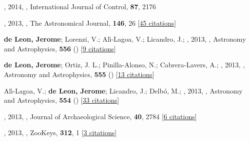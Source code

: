 \item[{\color{numcolor}\scriptsize59}] , 2014, , International Journal of Control, \textbf{87}, 2176

\item[{\color{numcolor}\scriptsize58}] , 2013, , The Astronomical Journal, \textbf{146}, 26 [\href{https://ui.adsabs.harvard.edu/abs/2013AJ....146...26C}{45 citations}]

\item[{\color{numcolor}\scriptsize57}] \textbf{de Leon, Jerome}; Lorenzi, V.; Al{\'\i}-Lagoa, V.; Licandro, J.; \etal, 2013, , Astronomy and Astrophysics, \textbf{556} () [\href{https://ui.adsabs.harvard.edu/abs/2013A&A...556A..33D}{9 citations}]

\item[{\color{numcolor}\scriptsize56}] \textbf{de Leon, Jerome}; Ortiz, J. L.; Pinilla-Alonso, N.; Cabrera-Lavers, A.; \etal, 2013, , Astronomy and Astrophysics, \textbf{555} () [\href{https://ui.adsabs.harvard.edu/abs/2013A&A...555L...2D}{13 citations}]

\item[{\color{numcolor}\scriptsize55}] Al{\'\i}-Lagoa, V.; \textbf{de Leon, Jerome}; Licandro, J.; Delb{\'o}, M.; \etal, 2013, , Astronomy and Astrophysics, \textbf{554} () [\href{https://ui.adsabs.harvard.edu/abs/2013A&A...554A..71A}{33 citations}]

\item[{\color{numcolor}\scriptsize54}] , 2013, , Journal of Archaeological Science, \textbf{40}, 2784 [\href{https://ui.adsabs.harvard.edu/abs/2013JArSc..40.2784H}{6 citations}]

\item[{\color{numcolor}\scriptsize53}] , 2013, , ZooKeys, \textbf{312}, 1 [\href{https://ui.adsabs.harvard.edu/abs/2013ZooK..312....1D}{3 citations}]

